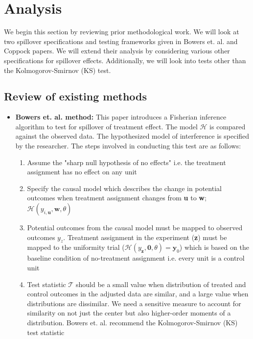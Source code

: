 \documentclass[12pt]{article}
\begin{document}
\section{Analysis}

We begin this section by reviewing prior methodological work. We will look at two spillover specifications and testing frameworks given in Bowers et. al. and Coppock papers. We will extend their analysis by considering various other specifications for spillover effects. Additionally, we will look into tests other than the Kolmogorov-Smirnov (KS) test.

\subsection{Review of existing methods}
\begin{itemize}
\item {\bf Bowers et. al. method:} This paper introduces a Fisherian inference algorithm to test for spillover of treatment effect. The model $\mathcal{H}$ is compared against the observed data. The hypothesized model of interference is specified by the researcher. The steps involved in conducting this test are as follows:

\begin{enumerate}

\item Assume the "sharp null hypothesis of no effects" i.e. the treatment assignment has no effect on any unit

\item Specify the causal model which describes the change in potential outcomes when treatment assignment changes from \textbf{u} to \textbf{w}; $\mathcal{H}(y_{i, \textbf{u}}, \textbf{w}, \theta)$

\item Potential outcomes from the causal model must be mapped to observed outcomes $y_z$. Treatment assignment in the experiment (\textbf{z}) must be mapped to the uniformity trial ($\mathcal{H}(y_{\textbf{z}}, \textbf{0}, \theta) = \textbf{y}_0$) which is based on the baseline condition of no-treatment assignment i.e. every unit is a control unit

\item Test statistic $\mathcal{T}$ should be a small value when distribution of treated and control outcomes in the adjusted data are similar, and a large value when distributions are dissimilar. We need a sensitive measure to account for similarity on not just the center but also higher-order moments of a distribution. Bowers et. al. recommend the Kolmogorov-Smirnov (KS) test statistic


\end{enumerate}
\end{itemize}
\end{document}
